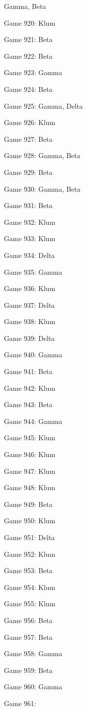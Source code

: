 \documentclass{article}
\begin{document}
\begin{multicols}{3}
\begin{compactitem}
Gamma, Beta
\item Game 920:
Klum
\item Game 921:
Beta
\item Game 922:
Beta
\item Game 923:
Gamma
\item Game 924:
Beta
\item Game 925:
Gamma, Delta
\item Game 926:
Klum
\item Game 927:
Beta
\item Game 928:
Gamma, Beta
\item Game 929:
Beta
\item Game 930:
Gamma, Beta
\item Game 931:
Beta
\item Game 932:
Klum
\item Game 933:
Klum
\item Game 934:
Delta
\item Game 935:
Gamma
\item Game 936:
Klum
\item Game 937:
Delta
\item Game 938:
Klum
\item Game 939:
Delta
\item Game 940:
Gamma
\item Game 941:
Beta
\item Game 942:
Klum
\item Game 943:
Beta
\item Game 944:
Gamma
\item Game 945:
Klum
\item Game 946:
Klum
\item Game 947:
Klum
\item Game 948:
Klum
\item Game 949:
Beta
\item Game 950:
Klum
\item Game 951:
Delta
\item Game 952:
Klum
\item Game 953:
Beta
\item Game 954:
Klum
\item Game 955:
Klum
\item Game 956:
Beta
\item Game 957:
Beta
\item Game 958:
Gamma
\item Game 959:
Beta
\item Game 960:
Gamma
\item Game 961:

\end{compactitem}
\end{multicols}
\end{document}
